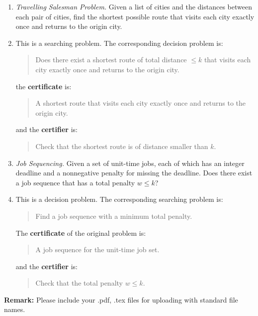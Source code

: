 \documentclass[12pt,a4paper]{article}
\makeatletter
\newtheorem*{solution}{Solution}
\theoremstyle{definition}
\renewenvironment{solution}[1][Solution] {\par\pushQED{\qed}\normalfont\topsep6\p@\@plus6\p@\relax\trivlist\item[\hskip\labelsep\bfseries#1\@addpunct{.}]\ignorespaces}{\popQED\endtrivlist\@endpefalse} \makeatother
\makeatother
\begin{document}
\begin{enumerate}
\begin{enumerate}
	    \item 
	    \textit{Travelling Salesman Problem.} Given a list of cities and the distances between each pair of cities, find the shortest possible route that visits each city exactly once and returns to the origin city.

		\begin{solution}
			This is a searching problem. The corresponding decision problem is:
			\begin{quotation}
				Does there exist a shortest route of total distance $\leq k$ that visits each city exactly once and returns to the origin city.
			\end{quotation}
			the \textbf{certificate} is:
			\begin{quotation}
				A shortest route that visits each city exactly once and returns to the origin city.
			\end{quotation} 
			and the \textbf{certifier} is:
			\begin{quotation}
				Check that the shortest route is of distance smaller than $k$.
			\end{quotation}
		\end{solution}
	    
	    \item
	    \textit{Job Sequencing.} Given a set of unit-time jobs, each of which has an integer deadline and a nonnegative penalty for missing the deadline. Does there exist a job sequence that has a total penalty $w\leqslant k$?
	    
		\begin{solution}
			This is a decision problem. The corresponding searching problem is:
			\begin{quotation}
				Find a job sequence with a minimum total penalty.
			\end{quotation}
			The \textbf{certificate} of the original problem is:
			\begin{quotation}
				A job sequence for the unit-time job set.
			\end{quotation}
			and the \textbf{certifier} is:
			\begin{quotation}
				Check that the total penalty $w\leq k$.
			\end{quotation}
		\end{solution}

	\end{enumerate}
\end{enumerate}

\textbf{Remark:} Please include your .pdf, .tex files for uploading with standard file names.
\newpage


\end{document}
